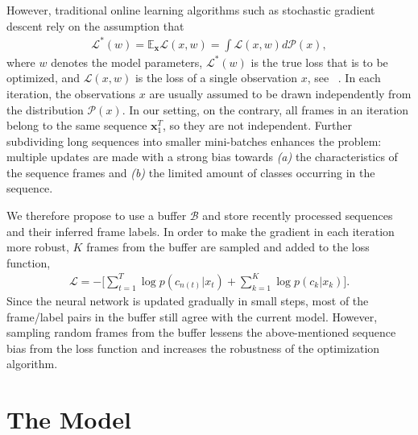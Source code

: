 \documentclass[10pt,twocolumn,letterpaper]{article}
\begin{document}
However, traditional online learning algorithms such as stochastic gradient descent rely on
the assumption that
\begin{align}
    \mathcal{L}^*(w) = \mathbb{E}_{\mathbf{x}} \mathcal{L}(x, w)
                     = \int \mathcal{L}(x, w) d\mathcal{P}(x),
\end{align}
where $ w $ denotes the model parameters, $ \mathcal{L}^*(w) $ is the true loss
that is to be optimized, and $ \mathcal{L}(x,w) $ is the loss of a single observation $ x $,
see \eg~\cite{bottou1998online}.
In each iteration, the observations $ x $ are usually assumed to be drawn independently
from the distribution $ \mathcal{P}(x) $. In our setting, on the contrary, all frames in
an iteration belong to the same sequence $ \mathbf{x}_1^T $, so they are
not independent. Further subdividing long sequences into smaller mini-batches
enhances the problem: multiple updates are made with a strong bias towards \textit{(a)}
the characteristics of the sequence frames and \textit{(b)} the limited amount of
classes occurring in the sequence.

We therefore propose to use a buffer $ \mathcal{B} $ and store recently processed sequences
and their inferred frame labels. In order to make the gradient in each iteration
more robust, $ K $ frames from the buffer are sampled and added to the loss function,
\begin{align}\label{eq:buffer}
    \mathcal{L} = -\Big[ \sum_{t=1}^T \log p(c_{n(t)}|x_t) + \sum_{k=1}^K \log p(c_k|x_k) \Big].
\end{align}
Since the neural network is updated gradually in small steps, most of the frame/label pairs
in the buffer still agree with the current model. However, sampling random frames from
the buffer lessens the above-mentioned sequence bias from the loss function and
increases the robustness of the optimization algorithm.



\section{The Model}
\label{sec:model}
\end{document}
